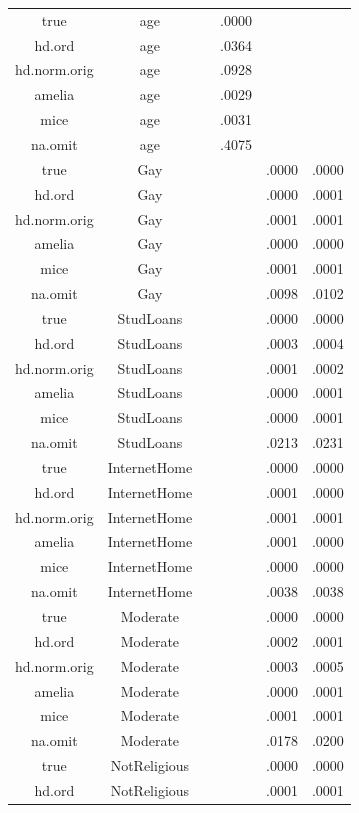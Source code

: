 \documentclass[12pt,econ]{sources/authesis}
\begin{document}
\begin{longtable}{@{\extracolsep{5pt}} cccccc}
true & age &  & .0000 &  &  \\ 
hd.ord & age &  & .0364 &  &  \\ 
hd.norm.orig & age &  & .0928 &  &  \\ 
amelia & age &  & .0029 &  &  \\ 
mice & age &  & .0031 &  &  \\ 
na.omit & age &  & .4075 &  &  \\ 
true & Gay &  &  & .0000 & .0000 \\ 
hd.ord & Gay &  &  & .0000 & .0001 \\ 
hd.norm.orig & Gay &  &  & .0001 & .0001 \\ 
amelia & Gay &  &  & .0000 & .0000 \\ 
mice & Gay &  &  & .0001 & .0001 \\ 
na.omit & Gay &  &  & .0098 & .0102 \\ 
true & StudLoans &  &  & .0000 & .0000 \\ 
hd.ord & StudLoans &  &  & .0003 & .0004 \\ 
hd.norm.orig & StudLoans &  &  & .0001 & .0002 \\ 
amelia & StudLoans &  &  & .0000 & .0001 \\ 
mice & StudLoans &  &  & .0000 & .0001 \\ 
na.omit & StudLoans &  &  & .0213 & .0231 \\ 
true & InternetHome &  &  & .0000 & .0000 \\ 
hd.ord & InternetHome &  &  & .0001 & .0000 \\ 
hd.norm.orig & InternetHome &  &  & .0001 & .0001 \\ 
amelia & InternetHome &  &  & .0001 & .0000 \\ 
mice & InternetHome &  &  & .0000 & .0000 \\ 
na.omit & InternetHome &  &  & .0038 & .0038 \\ 
true & Moderate &  &  & .0000 & .0000 \\ 
hd.ord & Moderate &  &  & .0002 & .0001 \\ 
hd.norm.orig & Moderate &  &  & .0003 & .0005 \\ 
amelia & Moderate &  &  & .0000 & .0001 \\ 
mice & Moderate &  &  & .0001 & .0001 \\ 
na.omit & Moderate &  &  & .0178 & .0200 \\ 
true & NotReligious &  &  & .0000 & .0000 \\ 
hd.ord & NotReligious &  &  & .0001 & .0001 \\ 

\end{longtable}
\end{document}
